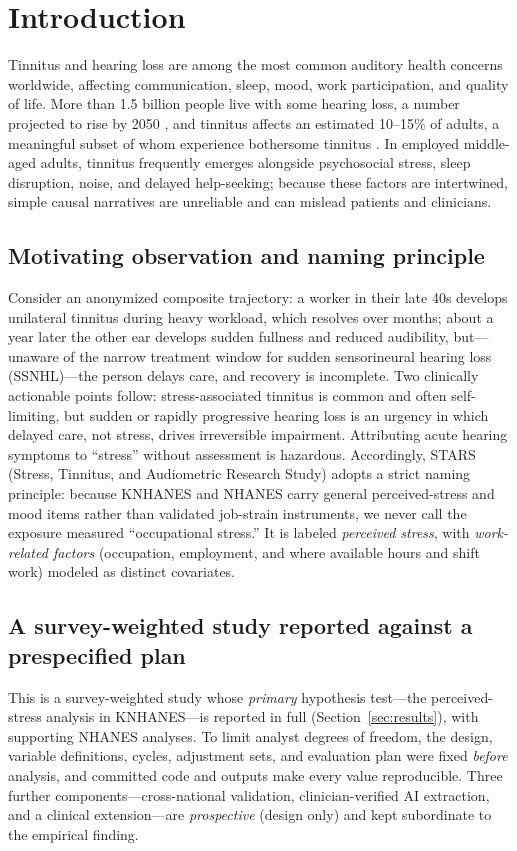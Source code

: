 \section{Introduction}
Tinnitus and hearing loss are among the most common auditory health concerns
worldwide, affecting communication, sleep, mood, work participation, and quality
of life. More than 1.5 billion people live with some hearing loss, a number
projected to rise by 2050 \citep{who2021world}, and tinnitus affects an estimated
10--15\% of adults, a meaningful subset of whom experience bothersome tinnitus
\citep{tunkel2014cpg,mccormack2016review}. In employed middle-aged adults,
tinnitus frequently emerges alongside psychosocial stress, sleep disruption,
noise, and delayed help-seeking; because these factors are intertwined, simple
causal narratives are unreliable and can mislead patients and clinicians.

\subsection{Motivating observation and naming principle}
Consider an anonymized composite trajectory: a worker in their late 40s develops
unilateral tinnitus during heavy workload, which resolves over months; about a
year later the other ear develops sudden fullness and reduced audibility, but---
unaware of the narrow treatment window for sudden sensorineural hearing loss
(SSNHL)---the person delays care, and recovery is incomplete. Two clinically
actionable points follow: stress-associated tinnitus is common and often
self-limiting, but sudden or rapidly progressive hearing loss is an urgency in
which delayed care, not stress, drives irreversible impairment. Attributing acute
hearing symptoms to ``stress'' without assessment is hazardous. Accordingly, STARS
(Stress, Tinnitus, and Audiometric Research Study) adopts a strict naming
principle: because KNHANES and NHANES carry general perceived-stress and mood
items rather than validated job-strain instruments, we never call the exposure
measured ``occupational stress.'' It is labeled \emph{perceived stress}, with
\emph{work-related factors} (occupation, employment, and where available hours and
shift work) modeled as distinct covariates.

\subsection{A survey-weighted study reported against a prespecified plan}
This is a survey-weighted study whose \emph{primary} hypothesis test---the
perceived-stress analysis in KNHANES---is reported in full
(Section~\ref{sec:results}), with supporting NHANES analyses. To limit analyst
degrees of freedom, the design, variable definitions, cycles, adjustment sets, and
evaluation plan were fixed \emph{before} analysis, and committed code and outputs
make every value reproducible. Three further components---cross-national
validation, clinician-verified AI extraction, and a clinical extension---are
\emph{prospective} (design only) and kept subordinate to the empirical finding.

